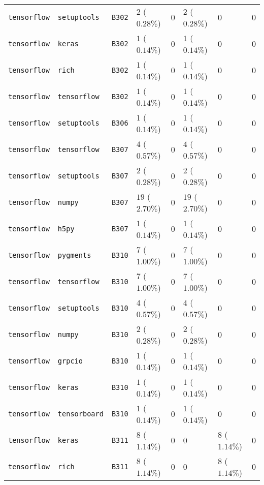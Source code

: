 \begin{table}
\begin{tabular}{llllllll}
\texttt{tensorflow} & \texttt{setuptools} & \texttt{B302} & $2$ ($0.28\%$) & $0$ & $2$ ($0.28\%$) & $0$ & $0$ \\
\texttt{tensorflow} & \texttt{keras} & \texttt{B302} & $1$ ($0.14\%$) & $0$ & $1$ ($0.14\%$) & $0$ & $0$ \\
\texttt{tensorflow} & \texttt{rich} & \texttt{B302} & $1$ ($0.14\%$) & $0$ & $1$ ($0.14\%$) & $0$ & $0$ \\
\texttt{tensorflow} & \texttt{tensorflow} & \texttt{B302} & $1$ ($0.14\%$) & $0$ & $1$ ($0.14\%$) & $0$ & $0$ \\
\texttt{tensorflow} & \texttt{setuptools} & \texttt{B306} & $1$ ($0.14\%$) & $0$ & $1$ ($0.14\%$) & $0$ & $0$ \\
\texttt{tensorflow} & \texttt{tensorflow} & \texttt{B307} & $4$ ($0.57\%$) & $0$ & $4$ ($0.57\%$) & $0$ & $0$ \\
\texttt{tensorflow} & \texttt{setuptools} & \texttt{B307} & $2$ ($0.28\%$) & $0$ & $2$ ($0.28\%$) & $0$ & $0$ \\
\texttt{tensorflow} & \texttt{numpy} & \texttt{B307} & $19$ ($2.70\%$) & $0$ & $19$ ($2.70\%$) & $0$ & $0$ \\
\texttt{tensorflow} & \texttt{h5py} & \texttt{B307} & $1$ ($0.14\%$) & $0$ & $1$ ($0.14\%$) & $0$ & $0$ \\
\texttt{tensorflow} & \texttt{pygments} & \texttt{B310} & $7$ ($1.00\%$) & $0$ & $7$ ($1.00\%$) & $0$ & $0$ \\
\texttt{tensorflow} & \texttt{tensorflow} & \texttt{B310} & $7$ ($1.00\%$) & $0$ & $7$ ($1.00\%$) & $0$ & $0$ \\
\texttt{tensorflow} & \texttt{setuptools} & \texttt{B310} & $4$ ($0.57\%$) & $0$ & $4$ ($0.57\%$) & $0$ & $0$ \\
\texttt{tensorflow} & \texttt{numpy} & \texttt{B310} & $2$ ($0.28\%$) & $0$ & $2$ ($0.28\%$) & $0$ & $0$ \\
\texttt{tensorflow} & \texttt{grpcio} & \texttt{B310} & $1$ ($0.14\%$) & $0$ & $1$ ($0.14\%$) & $0$ & $0$ \\
\texttt{tensorflow} & \texttt{keras} & \texttt{B310} & $1$ ($0.14\%$) & $0$ & $1$ ($0.14\%$) & $0$ & $0$ \\
\texttt{tensorflow} & \texttt{tensorboard} & \texttt{B310} & $1$ ($0.14\%$) & $0$ & $1$ ($0.14\%$) & $0$ & $0$ \\
\texttt{tensorflow} & \texttt{keras} & \texttt{B311} & $8$ ($1.14\%$) & $0$ & $0$ & $8$ ($1.14\%$) & $0$ \\
\texttt{tensorflow} & \texttt{rich} & \texttt{B311} & $8$ ($1.14\%$) & $0$ & $0$ & $8$ ($1.14\%$) & $0$ \\

\end{tabular}
\end{table}
